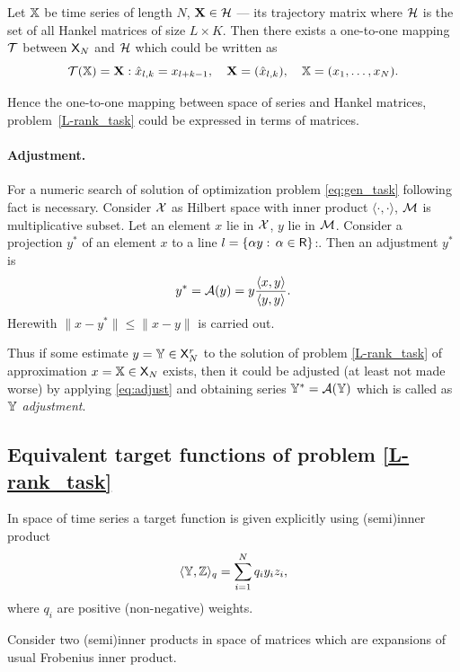 \documentclass[12pt,a4paper,fleqn,leqno]{article}
\begin{document}
Let $\mathbb{X}$ be time series of length $N$, $\mathbf{X} \in \mathcal{H}$ --- its trajectory matrix where $\mathcal{H}$ is the set of all Hankel matrices of size $L \times K$. Then there exists a one-to-one mapping $\mathcal{T}$ between $\mathsf{X}_N$ and $\mathcal{H}$ which could be written as
\begin{equation*}
\mathcal{T}(\mathbb{X}) = \mathbf{X}: \hat x_{l, k} = x_{l + k - 1}, \quad \mathbf{X} = (\hat x_{l,k}), \quad \mathbb{X} = (x_1, \ldots, x_N).
\end{equation*}

Hence the one-to-one mapping between space of series and Hankel matrices,
problem~\eqref{L-rank_task} could be expressed in terms of matrices.

\paragraph{Adjustment.} For a numeric search of solution of optimization problem \eqref{eq:gen_task} following fact is necessary.
Consider $\mathcal{X}$ as Hilbert space with inner product $\langle\cdot, \cdot\rangle$, $\mathcal{M}$ is multiplicative subset. Let an element $x$ lie in $\mathcal{X}$, $y$ lie in $\mathcal{M}$. Consider a projection $y^*$ of an element $x$ to a line $l = \{\alpha y:\, \alpha \in \mathsf{R}\}$:. Then an adjustment $y^*$ is
\begin{equation}
\label{eq:adjust}
y^* = \mathcal{A}(y)= y \frac{\langle x, y\rangle}{\langle y, y\rangle}.
\end{equation}
Herewith $\|x - y^*\| \le \|x - y\|$ is carried out.

Thus if some estimate $y=\mathbb{Y} \in \mathsf{X}_N^r$ to the solution of problem \eqref{L-rank_task} of approximation $x=\mathbb{X} \in \mathsf{X}_N$ exists, then it could be adjusted (at least not made worse) by applying \eqref{eq:adjust} and obtaining series $\mathbb{Y}^*=\mathcal{A}(\mathbb{Y})$ which is called as \emph{$\mathbb{Y}$ adjustment}.

\subsection{Equivalent target functions of problem \eqref{L-rank_task}}
In space of time series a target function is given explicitly using (semi)inner product
\begin{equation}
\label{eq:norm_ser}
    \langle\mathbb{Y},\mathbb{Z}\rangle_q = \sum_{i = 1}^N q_i y_i z_i,
\end{equation}
where $q_i$ are positive (non-negative) weights.

Consider two (semi)inner products in space of matrices which are expansions of usual Frobenius inner product.
\end{document}
